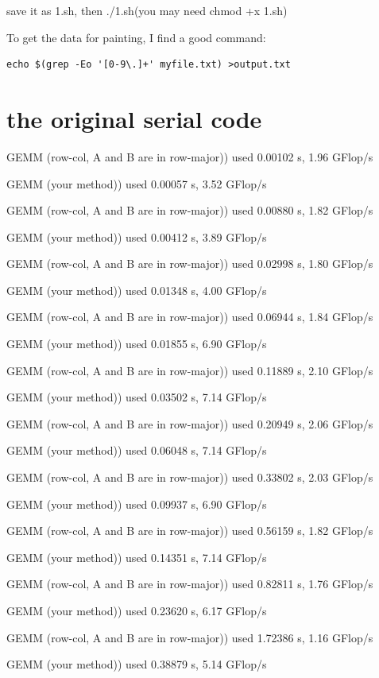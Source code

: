 \documentclass[12pt]{article}
\begin{document}
save it as 1.sh, then ./1.sh(you may need chmod +x 1.sh)


To get the data for painting, I find a good command:
\begin{lstlisting}
echo $(grep -Eo '[0-9\.]+' myfile.txt) >output.txt
\end{lstlisting}


\newpage
\section{the original serial code}

GEMM (row-col, A and B are in row-major)) used 0.00102 s, 1.96 GFlop/s

GEMM (your method)) used 0.00057 s, 3.52 GFlop/s

GEMM (row-col, A and B are in row-major)) used 0.00880 s, 1.82 GFlop/s

GEMM (your method)) used 0.00412 s, 3.89 GFlop/s

GEMM (row-col, A and B are in row-major)) used 0.02998 s, 1.80 GFlop/s

GEMM (your method)) used 0.01348 s, 4.00 GFlop/s

GEMM (row-col, A and B are in row-major)) used 0.06944 s, 1.84 GFlop/s

GEMM (your method)) used 0.01855 s, 6.90 GFlop/s

GEMM (row-col, A and B are in row-major)) used 0.11889 s, 2.10 GFlop/s

GEMM (your method)) used 0.03502 s, 7.14 GFlop/s

GEMM (row-col, A and B are in row-major)) used 0.20949 s, 2.06 GFlop/s

GEMM (your method)) used 0.06048 s, 7.14 GFlop/s

GEMM (row-col, A and B are in row-major)) used 0.33802 s, 2.03 GFlop/s

GEMM (your method)) used 0.09937 s, 6.90 GFlop/s

GEMM (row-col, A and B are in row-major)) used 0.56159 s, 1.82 GFlop/s

GEMM (your method)) used 0.14351 s, 7.14 GFlop/s

GEMM (row-col, A and B are in row-major)) used 0.82811 s, 1.76 GFlop/s

GEMM (your method)) used 0.23620 s, 6.17 GFlop/s

GEMM (row-col, A and B are in row-major)) used 1.72386 s, 1.16 GFlop/s

GEMM (your method)) used 0.38879 s, 5.14 GFlop/s
\end{document}
